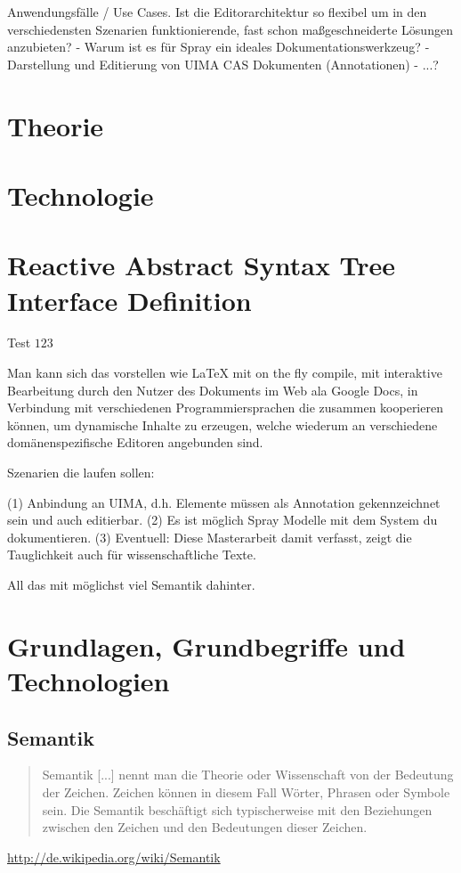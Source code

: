 Anwendungsfälle / Use Cases. Ist die Editorarchitektur so flexibel um in den
verschiedensten Szenarien funktionierende, fast schon maßgeschneiderte Lösungen
anzubieten?
  - Warum ist es für Spray ein ideales Dokumentationswerkzeug?
  - Darstellung und Editierung von UIMA CAS Dokumenten (Annotationen)
  - ...?



\chapter{Theorie}

\chapter{Technologie}

\chapter{Reactive Abstract Syntax Tree Interface Definition}

\citep{default}

Test $123$ \citep{6902013}

Man kann sich das vorstellen wie LaTeX mit on the fly compile,
mit interaktive Bearbeitung durch den Nutzer des Dokuments im Web ala
Google Docs, in Verbindung mit verschiedenen Programmiersprachen
die zusammen kooperieren können, um dynamische Inhalte zu erzeugen,
welche wiederum an verschiedene domänenspezifische Editoren angebunden sind.

Szenarien die laufen sollen:

(1) Anbindung an UIMA, d.h. Elemente müssen als Annotation gekennzeichnet sein
und auch editierbar.
(2) Es ist möglich Spray Modelle mit dem System du dokumentieren.
(3) Eventuell: Diese Masterarbeit damit verfasst, zeigt die Tauglichkeit
auch für wissenschaftliche Texte.

All das mit möglichst viel Semantik dahinter.

\chapter{Grundlagen, Grundbegriffe und Technologien}

\section{Semantik}

\begin{quote}Semantik [...] nennt man die Theorie oder Wissenschaft von der Bedeutung der Zeichen.
Zeichen können in diesem Fall Wörter, Phrasen oder Symbole sein. Die Semantik beschäftigt sich 
typischerweise mit den Beziehungen zwischen den Zeichen und den Bedeutungen dieser Zeichen.
\end{quote}
\url{http://de.wikipedia.org/wiki/Semantik}

